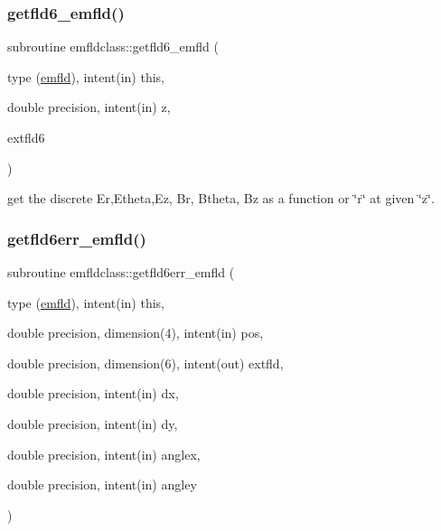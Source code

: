 \subsubsection{\texorpdfstring{getfld6\_emfld()}{getfld6\_emfld()}}
{\footnotesize\ttfamily subroutine emfldclass\+::getfld6\+\_\+emfld (\begin{DoxyParamCaption}\item[{type (\mbox{\hyperlink{namespaceemfldclass_structemfldclass_1_1emfld}{emfld}}), intent(in)}]{this,  }\item[{double precision, intent(in)}]{z,  }\item[{}]{extfld6 }\end{DoxyParamCaption})}



get the discrete Er,Etheta,Ez, Br, Btheta, Bz as a function or \char`\"{}r\char`\"{} at given \char`\"{}z\char`\"{}. 

\mbox{\label{namespaceemfldclass_ab5c872006557986fafd6080666ca68f1}} 
\subsubsection{\texorpdfstring{getfld6err\_emfld()}{getfld6err\_emfld()}}
{\footnotesize\ttfamily subroutine emfldclass\+::getfld6err\+\_\+emfld (\begin{DoxyParamCaption}\item[{type (\mbox{\hyperlink{namespaceemfldclass_structemfldclass_1_1emfld}{emfld}}), intent(in)}]{this,  }\item[{double precision, dimension(4), intent(in)}]{pos,  }\item[{double precision, dimension(6), intent(out)}]{extfld,  }\item[{double precision, intent(in)}]{dx,  }\item[{double precision, intent(in)}]{dy,  }\item[{double precision, intent(in)}]{anglex,  }\item[{double precision, intent(in)}]{angley }\end{DoxyParamCaption})}

\mbox{\label{namespaceemfldclass_a6a4833c66a8430fe7d7c3e005dd34c6e}} 
